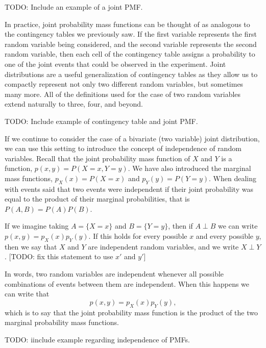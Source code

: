 \documentclass[
  letterpaper,
  DIV=11,
  numbers=noendperiod]{scrreprt}
\begin{document}
TODO: Include an example of a joint PMF.

In practice, joint probability mass functions can be thought of as
analogous to the contingency tables we previously saw. If the first
variable represents the first random variable being considered, and the
second variable represents the second random variable, then each cell of
the contingency table assigns a probability to one of the joint events
that could be observed in the experiment. Joint distributions are a
useful generalization of contingency tables as they allow us to
compactly represent not only two different random variables, but
sometimes many more. All of the definitions used for the case of two
random variables extend naturally to three, four, and beyond.

TODO: Include example of contingency table and joint PMF.

If we continue to consider the case of a bivariate (two variable) joint
distribution, we can use this setting to introduce the concept of
independence of random variables. Recall that the joint probability mass
function of \(X\) and \(Y\) is a function, \(p(x,y) = P(X = x, Y = y)\).
We have also introduced the marginal mass functions,
\(p_X(x) = P(X = x)\) and \(p_Y(y) = P(Y = y)\). When dealing with
events said that two events were independent if their joint probability
was equal to the product of their marginal probabilities, that is
\(P(A,B) = P(A)P(B)\).

If we imagine taking \(A=\{X=x\}\) and \(B=\{Y=y\}\), then if
\(A\perp B\) we can write \(p(x,y)=p_X(x)p_Y(y)\). If this holds for
every possible \(x\) and every possible \(y\), then we say that \(X\)
and \(Y\) are independent random variables, and we write \(X \perp Y\).
{[}TODO: fix this statement to use \(x'\) and \(y'\){]}

In words, two random variables are independent whenever all possible
combinations of events between them are independent. When this happens
we can write that \[p(x,y) = p_X(x)p_Y(y),\] which is to say that the
joint probability mass function is the product of the two marginal
probability mass functions.

TODO: iinclude example regarding independence of PMFs.
\end{document}
